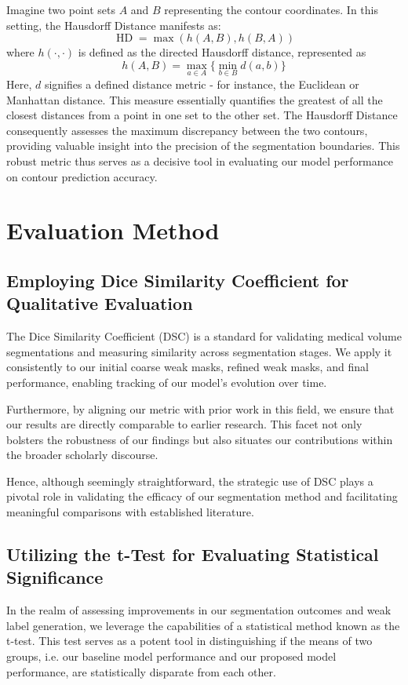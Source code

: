 Imagine two point sets \(A\) and \(B\) representing the contour coordinates. In this setting, the Hausdorff Distance manifests as:
\[
\operatorname*{HD} = \max \left(h(A, B), h(B, A)\right)
\]
where \(h(\cdot, \cdot)\) is defined as the directed Hausdorff distance, represented as
\[
h(A, B) = \max_{a \in A}\{ \min_{b \in B} d(a, b) \}
\]
Here, \(d\) signifies a defined distance metric - for instance, the Euclidean or Manhattan distance. This measure essentially quantifies the greatest of all the closest distances from a point in one set to the other set. The Hausdorff Distance consequently assesses the maximum discrepancy between the two contours, providing valuable insight into the precision of the segmentation boundaries. This robust metric thus serves as a decisive tool in evaluating our model performance on contour prediction accuracy.
\section{Evaluation Method}
\subsection{Employing Dice Similarity Coefficient for Qualitative Evaluation}
The Dice Similarity Coefficient (DSC) is a standard for validating medical volume segmentations and measuring similarity across segmentation stages. We apply it consistently to our initial coarse weak masks, refined weak masks, and final performance, enabling tracking of our model's evolution over time.

Furthermore, by aligning our metric with prior work in this field, we ensure that our results are directly comparable to earlier research. This facet not only bolsters the robustness of our findings but also situates our contributions within the broader scholarly discourse.

Hence, although seemingly straightforward, the strategic use of DSC plays a pivotal role in validating the efficacy of our segmentation method and facilitating meaningful comparisons with established literature.
\subsection{Utilizing the t-Test for Evaluating Statistical Significance}
In the realm of assessing improvements in our segmentation outcomes and weak label generation, we leverage the capabilities of a statistical method known as the t-test. This test serves as a potent tool in distinguishing if the means of two groups, i.e. our baseline model performance and our proposed model performance, are statistically disparate from each other.

